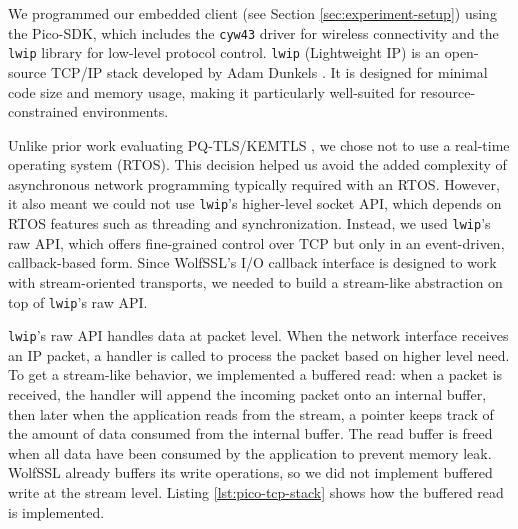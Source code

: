 \documentclass[letterpaper,12pt,titlepage,oneside,final]{book}
\begin{document}
We programmed our embedded client (see Section \ref{sec:experiment-setup}) using the Pico-SDK, which includes the \texttt{cyw43} driver for wireless connectivity and the \texttt{lwip} library for low-level protocol control.
\texttt{lwip} (Lightweight IP) is an open-source TCP/IP stack developed by Adam Dunkels \cite{lwip-dunkels-adam}. It is designed for minimal code size and memory usage, making it particularly well-suited for resource-constrained environments.

Unlike prior work evaluating PQ-TLS/KEMTLS \cite{DBLP:conf/space/GonzalezW22}, we chose not to use a real-time operating system (RTOS). This decision helped us avoid the added complexity of asynchronous network programming typically required with an RTOS. However, it also meant we could not use \texttt{lwip}’s higher-level socket API, which depends on RTOS features such as threading and synchronization. Instead, we used \texttt{lwip}’s raw API, which offers fine-grained control over TCP but only in an event-driven, callback-based form. Since WolfSSL’s I/O callback interface is designed to work with stream-oriented transports, we needed to build a stream-like abstraction on top of \texttt{lwip}’s raw API.

\texttt{lwip}'s raw API handles data at packet level.
When the network interface receives an IP packet, a handler is called to process the packet based on higher level need.
To get a stream-like behavior, we implemented a buffered read: when a packet is received, the handler will append the incoming packet onto an internal buffer, then later when the application reads from the stream, a pointer keeps track of the amount of data consumed from the internal buffer.
The read buffer is freed when all data have been consumed by the application to prevent memory leak.
WolfSSL already buffers its write operations, so we did not implement buffered write at the stream level.
Listing \ref{lst:pico-tcp-stack} shows how the buffered read is implemented.
\end{document}
